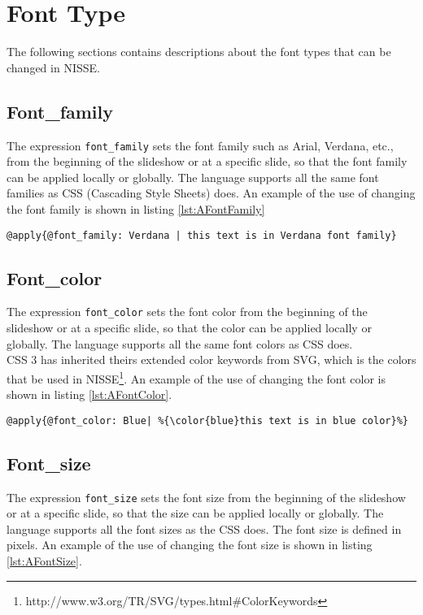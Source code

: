 \section{Font Type}
\label{AppendixFontType}
The following sections contains descriptions about the font types that can be changed in NISSE.

\subsection{Font\_family}
The expression \texttt{font\_family} sets the font family such as Arial, Verdana, etc., from the beginning of the slideshow or at a specific slide, so that the font family can be applied locally or globally. The language supports all the same font families as CSS (Cascading Style Sheets) does. An example of the use of changing the font family is shown in listing \ref{lst:AFontFamily}

\begin{lstlisting}[frame=single, caption=Changing font family, label=lst:AFontFamily ]
	@apply{@font_family: Verdana | this text is in Verdana font family}
\end{lstlisting}

\subsection{Font\_color}
The expression \texttt{font\_color} sets the font color from the beginning of the slideshow or at a specific slide, so that the color can be applied locally or globally. The language supports all the same font colors as CSS does. \\
CSS 3 has inherited theirs extended color keywords from SVG, which is the colors that be used in NISSE\footnote{http://www.w3.org/TR/SVG/types.html\#ColorKeywords}. An example of the use of changing the font color is shown in listing \ref{lst:AFontColor}.

\begin{lstlisting}[frame=single, caption=Changing font color, label=lst:AFontColor]
	@apply{@font_color: Blue| %{\color{blue}this text is in blue color}%}
\end{lstlisting}

\subsection{Font\_size}
The expression \texttt{font\_size} sets the font size from the beginning of the slideshow or at a specific slide, so that the size can be applied locally or globally. The language supports all the font sizes as the CSS does. The font size is defined in pixels. An example of the use of changing the font size is shown in listing \ref{lst:AFontSize}.

